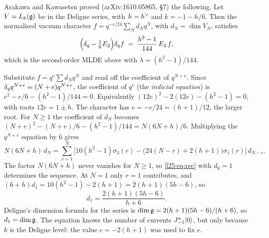 Arakawa and Kawasetsu proved (arXiv:1610.05865, \S7) the following. Let $V=L_k(\mathfrak g)$ be in the Deligne series,
with $h=h^{\vee}$ and $k=-1-h/6$. Then the normalised vacuum character $f=q^{-c/24}\sum_Nd_Nq^N$, with
$d_N=\dim V_N$, satisfies
\begin{equation}\label{l25:eq:mlde}
\Big(\delta_q-\tfrac{1}{6}E_2\Big)\delta_q f \;=\; \frac{h^2-1}{144}\,E_4\,f ,
\end{equation}
which is the second-order MLDE above with $\lambda=(h^2-1)/144$.

Substitute $f=q^{e}\sum d_Nq^N$ and read off the coefficient of $q^{N+e}$. Since $\delta_q q^{N+e}=(N+e)q^{N+e}$,
the coefficient of $q^e$ (the \emph{indicial equation}) is $e^2-e/6-(h^2-1)/144=0$. Equivalently
$(12e)^2-2(12e)-(h^2-1)=0$, with roots $12e=1\pm h$. The character has $e=-c/24=(h+1)/12$, the larger root. For
$N\ge1$ the coefficient of $d_N$ becomes $(N+e)^2-(N+e)/6-(h^2-1)/144=N(6N+h)/6$. Multiplying the $q^{N+e}$ equation by
$6$ gives
\begin{equation}\label{l25:eq:rec}
N(6N+h)\,d_N=\sum_{r=1}^{N}\Big[10(h^2-1)\sigma_3(r)-\big(24(N-r)+2(h+1)\big)\sigma_1(r)\Big]\,d_{N-r}.
\end{equation}
The factor $N(6N+h)$ never vanishes for $N\ge1$, so \eqref{l25:eq:rec} with $d_0=1$ determines the sequence. At $N=1$
only $r=1$ contributes, and $(6+h)d_1=10(h^2-1)-2(h+1)=2(h+1)(5h-6)$, so
\begin{equation*}
d_1=\frac{2(h+1)(5h-6)}{h+6}.
\end{equation*}
Deligne's dimension formula for the series is $\dim\mathfrak g=2(h+1)(5h-6)/(h+6)$, so $d_1=\dim\mathfrak g$. The
equation knows the number of currents $J^a_{-1}|0\rangle$, but only because $k$ is the Deligne level: the value
$c=-2(h+1)$ was used to fix $e$.


